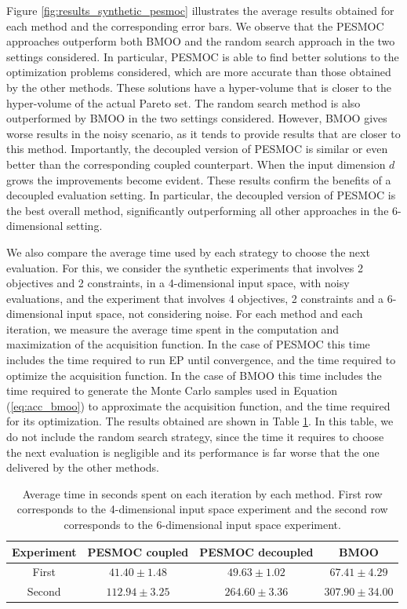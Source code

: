 Figure \ref{fig:results_synthetic_pesmoc} illustrates the average results obtained for each method and the corresponding error bars.
We observe that the PESMOC approaches outperform both BMOO and the random search approach in the two settings considered.
In particular, PESMOC is able to find better solutions to the optimization problems considered, which are more accurate than
those obtained by the other methods. These solutions have a hyper-volume that is closer to the hyper-volume of the actual Pareto set.
The random search method is also outperformed by BMOO in the two settings considered. However, BMOO gives worse results
in the noisy scenario, as it tends to provide results that are closer to this method. Importantly,
the decoupled version of PESMOC is similar or even better than the corresponding coupled counterpart. When the input
dimension $d$ grows the improvements become evident. These results confirm the benefits of a decoupled evaluation
setting. In particular, the decoupled version of PESMOC is the best overall method, significantly outperforming all other approaches in the $6$-dimensional setting.

We also compare the average time used by each strategy to choose the next evaluation. For this, we consider
the synthetic experiments that involves 2 objectives  and 2 constraints, in a 4-dimensional input space, with noisy
evaluations, and the experiment that involves 4 objectives, 2 constraints and a 6-dimensional input space, not considering noise.
For each method and each iteration, we measure the average time spent in the computation and
maximization of the acquisition function. In the case of PESMOC this time includes the time required to run EP until convergence,
and the time required to optimize the acquisition function. In the case of BMOO this time includes the time required
to generate the Monte Carlo samples used in Equation (\ref{eq:acc_bmoo}) to approximate the acquisition function, and the time required
for its optimization. The results obtained are shown in Table \ref{table:times}. In this table, we do not include the random search strategy, since the time it requires to choose the next evaluation is negligible and its performance is far worse that the one delivered by the other methods.

\begin{table}[htb]
\centering
\caption{Average time in seconds spent on each iteration by each method. First row corresponds to the 4-dimensional input space experiment and the second row corresponds to the 6-dimensional input space experiment.}
{\small
\begin{tabular}{c|c | c | c}
 \hline
 \bf{Experiment} & {\bf PESMOC coupled} & {\bf PESMOC decoupled} & {\bf BMOO}\\
 \hline
 First & $41.40 \pm 1.48$ & $49.63 \pm 1.02$ & $67.41 \pm 4.29$\\
 Second & $112.94 \pm 3.25$ & $264.60 \pm 3.36$ & $307.90 \pm 34.00$\\
 \hline
\end{tabular}
}
\label{table:times}
\end{table}

